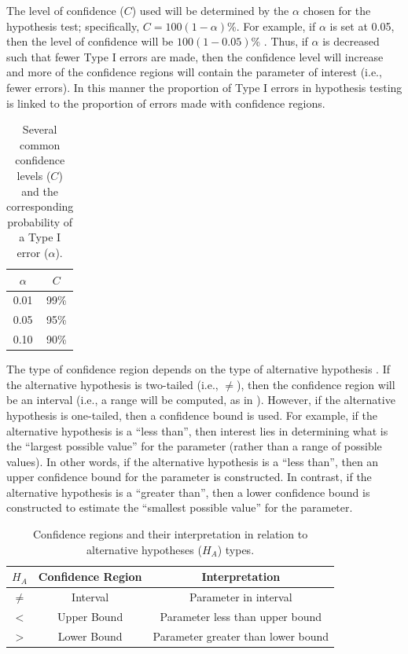 \documentclass[10pt,openany]{book}\usepackage[]{graphicx}\usepackage[]{color}
\begin{document}
The level of confidence ($C$) used will be determined by the $\alpha$ chosen for the hypothesis test; specifically, $C=100(1-\alpha)$\%. For example, if $\alpha$ is set at 0.05, then the level of confidence will be $100(1-0.05)$\% . Thus, if $\alpha$ is decreased such that fewer Type I errors are made, then the confidence level will increase and more of the confidence regions will contain the parameter of interest (i.e., fewer errors). In this manner the proportion of Type I errors in hypothesis testing is linked to the proportion of errors made with confidence regions.

\begin{table}[htbp]
\caption{Several common confidence levels ($C$) and the corresponding probability of a Type I error ($\alpha$).}
\label{tab:Calpha}
\centering
\begin{tabular}{cc}
\hline\hline
$\alpha$ & $C$ \\
\hline
0.01 & 99\% \\
0.05 & 95\% \\
0.10 & 90\% \\
\hline\hline
\end{tabular}
\end{table}

The type of confidence region depends on the type of alternative hypothesis . If the alternative hypothesis is two-tailed (i.e., $\neq$), then the confidence region will be an interval (i.e., a range will be computed, as in ). However, if the alternative hypothesis is one-tailed, then a confidence bound is used. For example, if the alternative hypothesis is a ``less than'', then interest lies in determining what is the ``largest possible value'' for the parameter (rather than a range of possible values). In other words, if the alternative hypothesis is a ``less than'', then an upper confidence bound for the parameter is constructed. In contrast, if the alternative hypothesis is a ``greater than'', then a lower confidence bound is constructed to estimate the ``smallest possible value'' for the parameter.

\begin{table}[htbp]
\caption{Confidence regions and their interpretation in relation to alternative hypotheses ($H_{A}$) types.}
\label{tab:HAsCI}
\centering
\begin{tabular}{ccc}
\hline\hline
$H_{A}$ & Confidence Region & Interpretation \\
\hline
$\neq$ & Interval & Parameter in interval \\
$<$ & Upper Bound & Parameter less than upper bound \\
$>$ & Lower Bound & Parameter greater than lower bound \\
\hline\hline
\end{tabular}
\end{table}
\end{document}
